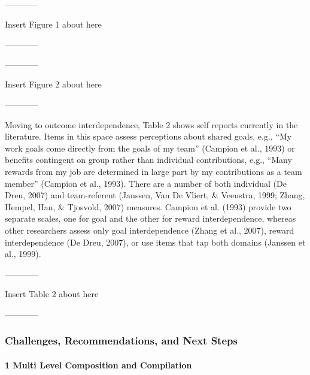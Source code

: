 \documentclass[english,,man]{apa6}
\let\oldparagraph\paragraph
\renewcommand{\paragraph}[1]{\oldparagraph{#1}\mbox{}}
\theoremstyle{definition}
\theoremstyle{definition}
\theoremstyle{definition}
\theoremstyle{remark}
\begin{document}
\begin{center}

------------

Insert Figure 1 about here

------------

\end{center}

\begin{center}

------------

Insert Figure 2 about here

------------

\end{center}

Moving to outcome interdependence, Table 2 shows self reports currently
in the literature. Items in this space assess perceptions about shared
goals, e.g., \enquote{My work goals come directly from the goals of my
team} (Campion et al., 1993) or benefits contingent on group rather than
individual contributions, e.g., \enquote{Many rewards from my job are
determined in large part by my contributions as a team member} (Campion
et al., 1993). There are a number of both individual (De Dreu, 2007) and
team-referent (Janssen, Van De Vliert, \& Veenstra, 1999; Zhang, Hempel,
Han, \& Tjosvold, 2007) measures. Campion et al. (1993) provide two
separate scales, one for goal and the other for reward interdependence,
whereas other researchers assess only goal interdependence (Zhang et
al., 2007), reward interdependence (De Dreu, 2007), or use items that
tap both domains (Janssen et al., 1999).

\begin{center}

------------

Insert Table 2 about here

------------

\end{center}

\hypertarget{challenges-recommendations-and-next-steps}{%
\subsubsection{Challenges, Recommendations, and Next
Steps}\label{challenges-recommendations-and-next-steps}}

\hypertarget{multi-level-composition-and-compilation}{%
\paragraph{1 Multi Level Composition and
Compilation}\label{multi-level-composition-and-compilation}}
\end{document}
